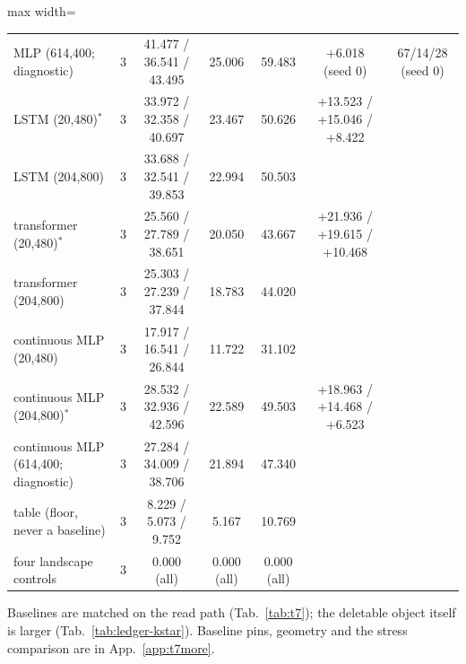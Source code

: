 \documentclass{article} %
\begin{document}
\begin{table}[t]
\begin{adjustbox}{max width=\linewidth}
\begin{tabular}{lcccccc}
MLP (614,400; diagnostic) & 3 & 41.477 / 36.541 / 43.495 & 25.006 & 59.483 & +6.018 (seed 0) & 67/14/28 (seed 0) \\
LSTM (20,480)$^\ast$ & 3 & 33.972 / 32.358 / 40.697 & 23.467 & 50.626 & +13.523 / +15.046 / +8.422 & \\
LSTM (204,800) & 3 & 33.688 / 32.541 / 39.853 & 22.994 & 50.503 & & \\
transformer (20,480)$^\ast$ & 3 & 25.560 / 27.789 / 38.651 & 20.050 & 43.667 & +21.936 / +19.615 / +10.468 & \\
transformer (204,800) & 3 & 25.303 / 27.239 / 37.844 & 18.783 & 44.020 & & \\
continuous MLP (20,480) & 3 & 17.917 / 16.541 / 26.844 & 11.722 & 31.102 & & \\
continuous MLP (204,800)$^\ast$ & 3 & 28.532 / 32.936 / 42.596 & 22.589 & 49.503 & +18.963 / +14.468 / +6.523 & \\
continuous MLP (614,400; diagnostic) & 3 & 27.284 / 34.009 / 38.706 & 21.894 & 47.340 & & \\
table (floor, never a baseline) & 3 & 8.229 / 5.073 / 9.752 & 5.167 & 10.769 & & \\
\midrule
four landscape controls & 3 & 0.000 (all) & 0.000 (all) & 0.000 (all) & & \\
\bottomrule
\end{tabular}\end{adjustbox}
\end{table}

\noindent Baselines are matched on the read path (Tab.~\ref{tab:t7}); the deletable object
itself is larger (Tab.~\ref{tab:ledger-kstar}). Baseline pins, geometry and the stress comparison are in App.~\ref{app:t7more}.

\end{document}

